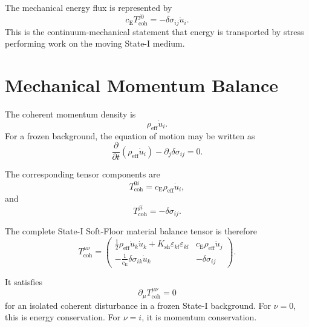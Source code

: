 The mechanical energy flux is represented by
\begin{equation}
    c_{\mathrm{E}}T_{\mathrm{coh}}^{j0} = -\delta\sigma_{ij}\dot{u}_i.
\end{equation}
This is the continuum-mechanical statement that energy is transported by stress performing work on the moving State-I medium.

\section{Mechanical Momentum Balance}

The coherent momentum density is
\begin{equation}
    \rho_{\mathrm{eff}}\dot{u}_i.
\end{equation}
For a frozen background, the equation of motion may be written as
\begin{equation}
    \frac{\partial}{\partial t} \left( \rho_{\mathrm{eff}}\dot{u}_i \right) - \partial_j\delta\sigma_{ij} = 0.
\end{equation}

The corresponding tensor components are
\begin{equation}
    T_{\mathrm{coh}}^{0i} = c_{\mathrm{E}} \rho_{\mathrm{eff}}\dot{u}_i,
\end{equation}
and
\begin{equation}
    T_{\mathrm{coh}}^{ji} = -\delta\sigma_{ij}.
\end{equation}

The complete State-I Soft-Floor material balance tensor is therefore
\begin{equation}
    T_{\mathrm{coh}}^{\mu\nu} =
    \begin{pmatrix}
        \displaystyle
        \frac{1}{2}\rho_{\mathrm{eff}}\dot{u}_k\dot{u}_k + K_{\mathrm{sh}}\varepsilon_{kl}\varepsilon_{kl}
        &
        \displaystyle
        c_{\mathrm{E}}\rho_{\mathrm{eff}}\dot{u}_j
        \\[8pt]
        \displaystyle
        -\frac{1}{c_{\mathrm{E}}} \delta\sigma_{ik}\dot{u}_k
        &
        \displaystyle
        -\delta\sigma_{ij}
    \end{pmatrix}.
\end{equation}

It satisfies
\begin{equation}
    \partial_\mu T_{\mathrm{coh}}^{\mu\nu}=0
\end{equation}
for an isolated coherent disturbance in a frozen State-I background. For $\nu=0$, this is energy conservation. For $\nu=i$, it is momentum conservation.

